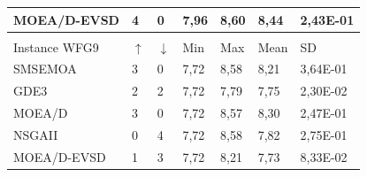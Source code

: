\begin{table}[H]
\begin{scriptsize}
{\begin{tabular}{lllllll}
 \multicolumn{1}{|l|}{MOEA/D-EVSD} & \multicolumn{1}{l|}{4} & \multicolumn{1}{l|}{0} & \multicolumn{1}{l|}{7,96} & \multicolumn{1}{l|}{8,60} & \multicolumn{1}{l|}{8,44} & \multicolumn{1}{l|}{2,43E-01} \\ \hline
  &  &  &  &  &  &  \\ \hline
 \multicolumn{1}{|l|}{Instance WFG9} & \multicolumn{1}{l|}{$\uparrow$} & \multicolumn{1}{l|}{$\downarrow$} & \multicolumn{1}{l|}{Min} & \multicolumn{1}{l|}{Max} & \multicolumn{1}{l|}{Mean} & \multicolumn{1}{l|}{SD} \\ \hline
 \multicolumn{1}{|l|}{SMSEMOA} & \multicolumn{1}{l|}{3} & \multicolumn{1}{l|}{0} & \multicolumn{1}{l|}{7,72} & \multicolumn{1}{l|}{8,58} & \multicolumn{1}{l|}{8,21} & \multicolumn{1}{l|}{3,64E-01} \\ \hline
 \multicolumn{1}{|l|}{GDE3} & \multicolumn{1}{l|}{2} & \multicolumn{1}{l|}{2} & \multicolumn{1}{l|}{7,72} & \multicolumn{1}{l|}{7,79} & \multicolumn{1}{l|}{7,75} & \multicolumn{1}{l|}{2,30E-02} \\ \hline
 \multicolumn{1}{|l|}{MOEA/D} & \multicolumn{1}{l|}{3} & \multicolumn{1}{l|}{0} & \multicolumn{1}{l|}{7,72} & \multicolumn{1}{l|}{8,57} & \multicolumn{1}{l|}{8,30} & \multicolumn{1}{l|}{2,47E-01} \\ \hline
 \multicolumn{1}{|l|}{NSGAII} & \multicolumn{1}{l|}{0} & \multicolumn{1}{l|}{4} & \multicolumn{1}{l|}{7,72} & \multicolumn{1}{l|}{8,58} & \multicolumn{1}{l|}{7,82} & \multicolumn{1}{l|}{2,75E-01} \\ \hline
 \multicolumn{1}{|l|}{MOEA/D-EVSD} & \multicolumn{1}{l|}{1} & \multicolumn{1}{l|}{3} & \multicolumn{1}{l|}{7,72} & \multicolumn{1}{l|}{8,21} & \multicolumn{1}{l|}{7,73} & \multicolumn{1}{l|}{8,33E-02} \\ \hline
 \end{tabular}
}
 \end{scriptsize}
 \end{table}

